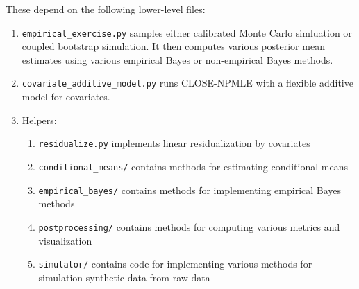\documentclass[10pt]{article}
\begin{document}
These depend on the following lower-level files:
\begin{enumerate}
   \item \texttt{empirical\_exercise.py} samples either calibrated Monte Carlo simluation
   or coupled bootstrap simulation. It then computes various posterior mean estimates
   using various empirical Bayes or non-empirical Bayes methods. 
   \item \texttt{covariate\_additive\_model.py} runs CLOSE-NPMLE with a flexible additive
   model for covariates. 
   \item Helpers:
   \begin{enumerate}
     \item \texttt{residualize.py} implements linear residualization by covariates
     \item \texttt{conditional\_means/} contains methods for estimating conditional means
     \item \texttt{empirical\_bayes/} contains methods for implementing empirical Bayes
     methods
     \item \texttt{postprocessing/} contains methods for computing various metrics and
     visualization
     \item \texttt{simulator/} contains code for implementing various methods for
     simulation synthetic data from raw data
   \end{enumerate}
 \end{enumerate} 




\end{document}
